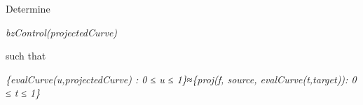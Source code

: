 \documentclass{article}
\begin{document}
\begin{Maple Normal}{
\begin{Maple Normal}{
\textit{}}\end{Maple Normal}
}\end{Maple Normal}
\begin{Maple Normal}{
\begin{Maple Normal}{
Determine}\end{Maple Normal}

}\end{Maple Normal}

\begin{Maple Normal}{
\begin{Maple Normal}{
}\end{Maple Normal}
}\end{Maple Normal}
\begin{Maple Normal}{
\begin{Maple Normal}{
\textit{bzControl(projectedCurve)}}\end{Maple Normal}

}\end{Maple Normal}

\begin{Maple Normal}{
\begin{Maple Normal}{
}\end{Maple Normal}
}\end{Maple Normal}
\begin{Maple Normal}{
\begin{Maple Normal}{
such that}\end{Maple Normal}

}\end{Maple Normal}

\begin{Maple Normal}{
\begin{Maple Normal}{
}\end{Maple Normal}
}\end{Maple Normal}
\begin{Maple Normal}{
\begin{Maple Normal}{
\textit{\{}\textit{evalCurve(u,projectedCurve) : 0 ≤ u ≤ 1}\textit{\}}\textit{≈}\textit{\{}\textit{proj(f, source, evalCurve(t,target)): 0 ≤ t ≤ 1}\textit{\}}}\end{Maple Normal}

}\end{Maple Normal}
\end{document}
